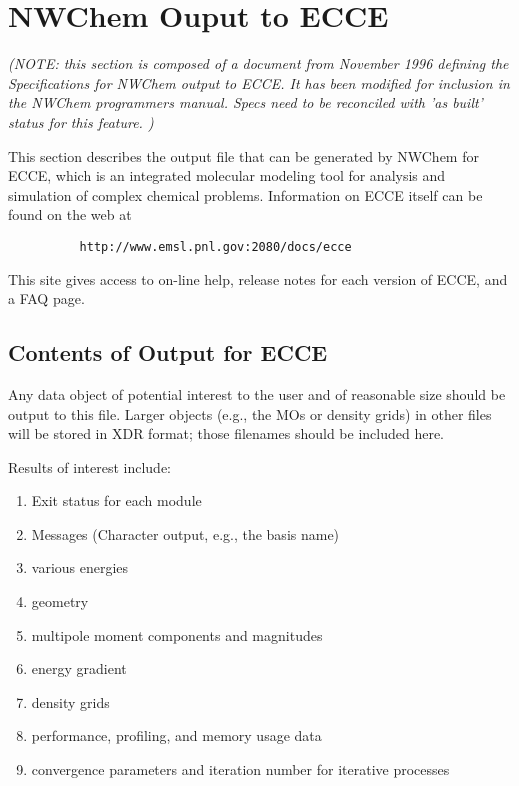 %
%
\section{NWChem Ouput to ECCE}

{\em 
(NOTE: this section is composed of a document from November 1996
defining the Specifications for NWChem output to ECCE.  It
has been modified for inclusion
in the NWChem programmers manual.  Specs need to be
reconciled with 'as built' status for this feature.
)}

This section describes the output file that can be generated by NWChem for
ECCE, which is an integrated molecular modeling tool for analysis and
simulation of complex chemical problems.  Information on ECCE itself
can be found on the web at 

\begin{verbatim}
          http://www.emsl.pnl.gov:2080/docs/ecce
\end{verbatim}

This
site gives access to on-line help, release notes for each version of
ECCE, and a FAQ page.

\subsection{Contents of Output for ECCE}
Any data object of potential interest to the user and of reasonable size
should be output to this file.  Larger objects (e.g., the MOs or density
grids) in other files will be stored in XDR format; those filenames should be 
included here.

Results of interest include:
\begin{enumerate}
\item  Exit status for each module
\item   Messages (Character output, e.g., the basis name)
\item  various energies
\item   geometry
\item  multipole moment components and magnitudes
\item   energy gradient
\item density grids
\item performance, profiling, and memory usage data
\item   convergence parameters and iteration number for iterative processes
\end{enumerate}

